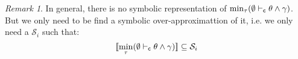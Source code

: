 \documentclass[a4paper]{article}
\theoremstyle{remark}
\newtheorem{remark}{Remark}
\begin{document}
\begin{mathpar}
\end{mathpar}

\begin{remark}
  In general, there is no symbolic representation of $\min_{\tau}(\centail{\emptyset}{\theta\wedge\gamma})$. But we only need to be find a symbolic over-approximattion of it, i.e. we only need a $\mathcal{S}_i$ such that:
  \[
    \sem{\min_{\tau}(\centail{\emptyset}{\theta\wedge\gamma})}
    \subseteq \mathcal{S}_i
  \]
\end{remark}
\end{document}
